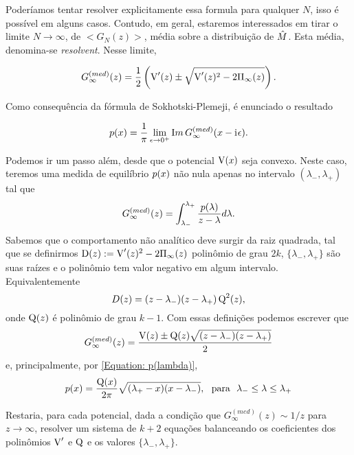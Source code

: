 Poderíamos tentar resolver explicitamente essa formula para qualquer $N$, isso é possível em alguns casos. Contudo, em geral, estaremos interessados em tirar o limite $N \to \infty$, de $<G_N(z)>$, média sobre a distribuição de $\hat M$. Esta média, denomina-se \textit{resolvent}. Nesse limite,

\begin{equation}
	G^{(med)}_{\infty}(z) = \frac{1}{2} \left( \operatorname{V}'(z) \pm \sqrt{\operatorname{V}'(z)^2 - 2 \Pi_{\infty}(z) }\right).
	\label{Equation: Resolvent}
\end{equation}

\noindent Como consequência da fórmula de Sokhotski-Plemeji, é enunciado o resultado 

\begin{equation}
	p(x) = \frac{1}{\pi} \lim_{\epsilon \to 0^+} \mathop{\textrm Im}{G_{\infty}^{(med)}(x - \mathrm{i}\mkern1mu\epsilon)}.
	\label{Equation: p(lambda)}
\end{equation}

Podemos ir um passo além, desde que o potencial $\operatorname{V}(x)$ seja convexo. Neste caso, teremos uma medida de equilíbrio $p(x)$ não nula apenas no intervalo $(\lambda_{-}, \lambda_{+})$ tal que $$G_{\infty}^{(med)}(z) = \int_{\lambda_{-}}^{\lambda_{+}} \frac{p(\lambda)}{z - \lambda} d\lambda.$$ Sabemos que o comportamento não analítico deve surgir da raiz quadrada, tal que se definirmos $\operatorname{D}(z) := \operatorname{V}'(z)^2 - 2 \Pi_{\infty}(z)$ polinômio de grau $2k$, $\{\lambda_{-}, \lambda_{+}\}$ são suas raízes e o polinômio tem valor negativo em algum intervalo. Equivalentemente $$D(z) = (z-\lambda_{-})(z - \lambda_{+}) \operatorname{Q}^2(z),$$ onde $\operatorname{Q}(z)$ é polinômio de grau $k-1$. Com essas definições podemos escrever que $$G_{\infty}^{(med)}(z) = \frac{\operatorname{V}(z) \pm \operatorname{Q}(z) \sqrt{(z - \lambda_{-})(z - \lambda_{+})}}{2}$$ e, principalmente, por \ref{Equation: p(lambda)},
\begin{equation}
	p(x) =\frac{\operatorname{Q}(x)}{2\pi} \sqrt{(\lambda_{+} - x)(x - \lambda_{-})}, \ \ \text{para} \ \  \lambda_{-} \leq \lambda \leq \lambda_{+}
\end{equation}

Restaria, para cada potencial, dada a condição que $G_{\infty}^{(med)}(z) \sim 1/z$ para $z \rightarrow \infty$, resolver um sistema de $k+2$ equações balanceando os coeficientes dos polinômios $\operatorname{V}'$ e $\operatorname{Q}$ e os valores $\{\lambda_{-}, \lambda_{+}\}$.


